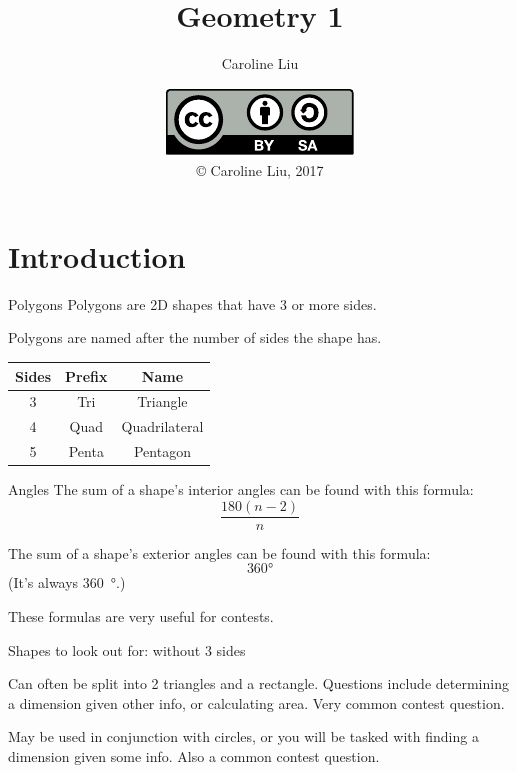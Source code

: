 

\usepackage{siunitx}
\usepackage{tikz}
\usepackage{tkz-euclide}


\title{Geometry 1}
\author{Caroline Liu}
\date{\includegraphics{../LicenseLogo}\\\copyright{} Caroline Liu, 2017}


	\frame{\titlepage}
	\section{Introduction}
	\begin{namedframe}{Polygons}
		Polygons are 2D shapes that have 3 or more sides.
		\pause

		Polygons are named after the number of sides the shape has.
		\pause

		\begin{center}
			\begin{tabular}{|c|c|c|}
				\hline
				Sides & Prefix & Name\\\hline
				3     & Tri    & Triangle\\
				4     & Quad   & Quadrilateral\\
				5     & Penta  & Pentagon\\\hline
			\end{tabular}
		\end{center}
	\end{namedframe}
	\begin{namedframe}{Angles}
		The sum of a shape's interior angles can be found with this formula:
		\[\frac{180(n-2)}{n}\]
		\pause

		The sum of a shape's exterior angles can be found with this formula:
		\[360\si{\degree}\]
		(It's always \SI{360}{\degree}.)
		\pause

		These formulas are \alert{very} useful for contests.
	\end{namedframe}
	\begin{namedframe}{Shapes to look out for: without 3 sides}
		\begin{description}[<+->]
			\item[Trapezoids] Can often be split into 2 triangles and a rectangle. Questions include determining a dimension given other info, or calculating area. Very common contest question.
			\item[Parallelograms, squares, and rectangles] May be used in conjunction with circles, or you will be tasked with finding a dimension given some info. Also a common contest question.
		\end{description}
	\end{namedframe}
